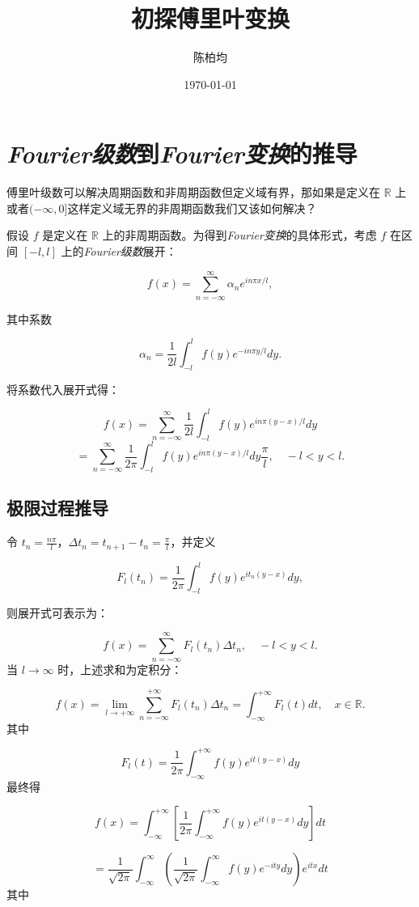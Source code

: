 \documentclass[12pt,a4paper]{article}
\title{初探傅里叶变换}
\author{陈柏均}
\date{\today}
\newcommand{\R}{\mathbb{R}}                %
\theoremstyle{plain}
\theoremstyle{definition}
\theoremstyle{remark}
\begin{document}
	
	\maketitle
	
	\section{\emph{Fourier级数}到\emph{Fourier变换}的推导}
	傅里叶级数可以解决周期函数和非周期函数但定义域有界，那如果是定义在 \(\R\) 上或者$(-\infty, 0]$这样定义域无界的非周期函数我们又该如何解决？
	
	
	假设 \( f \) 是定义在 \(\R\) 上的非周期函数。为得到\emph{Fourier变换}的具体形式，考虑 \( f \) 在区间 \([-l, l]\) 上的\emph{Fourier级数}展开：
	
	\[
	f(x) = \sum_{n=-\infty}^{\infty} \alpha_n e^{in\pi x/l},
	\]
	
	其中系数
	
	\[
	\alpha_n = \frac{1}{2l} \int_{-l}^{l} f(y)e^{-in\pi y/l} dy.
	\]
	
	将系数代入展开式得：
	
	\[
	f(x) = \sum_{n=-\infty}^{\infty} \frac{1}{2l} \int_{-l}^{l} f(y)e^{in\pi (y-x)/l} dy
	\]
	\[
	= \sum_{n=-\infty}^{\infty} \frac{1}{2\pi} \int_{-l}^{l} f(y)e^{in\pi (y-x)/l} dy  \frac{\pi}{l}, \quad -l < y < l.
	\]
	
	\subsection{极限过程推导}
	令 \( t_n = \frac{n\pi}{l} \)，\(\Delta t_n = t_{n+1} - t_n = \frac{\pi}{l}\)，并定义
	
	\[
	F_l(t_n) = \frac{1}{2\pi} \int_{-l}^{l} f(y)e^{it_n(y-x)} dy,
	\]
	
	则展开式可表示为：
	
	\[
	f(x) = \sum_{n=-\infty}^{\infty} F_l(t_n) \Delta t_n, \quad -l < y < l.
	\]
	当 \( l \to \infty \) 时，上述求和为定积分：
	
	\[
	f(x) = \lim_{l \to +\infty} \sum_{n=-\infty}^{+\infty} F_l(t_n) \Delta t_n = \int_{-\infty}^{+\infty} F_l(t) dt, \quad x \in \R.
	\]
	其中
	
	\[
	F_l(t) = \frac{1}{2\pi} \int_{-\infty}^{+\infty} f(y)e^{it(y-x)} dy
	\]
	最终得
	
	\[
	f(x) = \int_{-\infty}^{+\infty} \left[ \frac{1}{2\pi} \int_{-\infty}^{+\infty} f(y)e^{it(y-x)} dy \right] dt 
	\]
	
	\[
	= \frac{1}{\sqrt{2\pi}} \int_{-\infty}^{\infty} \left( \frac{1}{\sqrt{2\pi}} \int_{-\infty}^{\infty} f(y) e^{-i t y} dy \right) e^{i t x} dt
	\]
	其中
	
\end{document}
